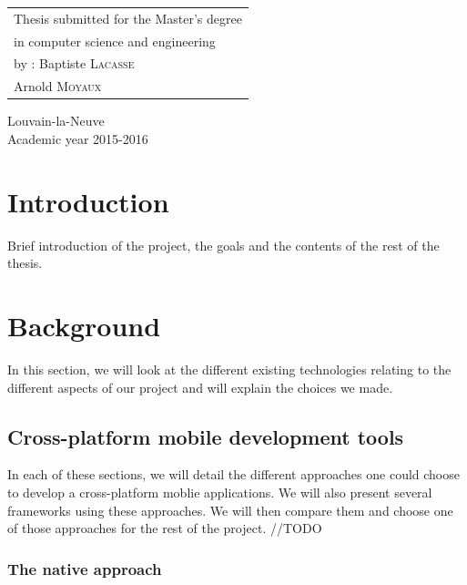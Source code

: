 \documentclass[11pt, a4paper]{report}
\newcommand\nametwo{Arnold \textsc{Moyaux}}
\newcommand\nameone{Baptiste \textsc{Lacasse}}
\newcommand\years{2015-2016}
\begin{document}
\begin{minipage}{.5\textwidth}
\begin{tabular}{l}
Thesis submitted for the Master's degree
\\ in computer science and engineering
\\ by : \nameone
\\ 	   \nametwo
\end{tabular}
\end{minipage}
\vfill
\begin{center}
Louvain-la-Neuve
\\ Academic year \years
\end{center}

\tableofcontents %
\newpage %


\chapter{Introduction} %

Brief introduction of the project, the goals and the contents of the rest of the thesis.


\chapter{Background}

In this section, we will look at the different existing technologies relating to the different aspects of our project and will explain the choices we made. 

\section{Cross-platform mobile development tools}

In each of these sections, we will detail the different approaches one could choose to develop a cross-platform moblie applications. We will also present several frameworks using these approaches. We will then compare them and choose one of those approaches for the rest of the project. //TODO
\subsection{The native approach}
\end{document}
